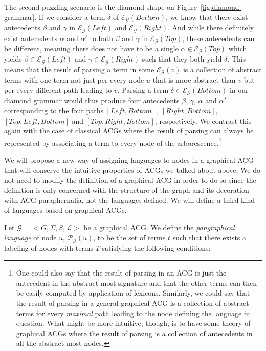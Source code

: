 The second puzzling scenario is the diamond shape on
Figure~\ref{fig:diamond-grammar}. If we consider a term $\delta$ of
$\mathcal{E}_{\mathcal{G}}(Bottom)$, we know that there exist
antecedents $\beta$ and $\gamma$ in $\mathcal{E}_{\mathcal{G}}(Left)$
and $\mathcal{E}_{\mathcal{G}}(Right)$. And while there definitely exist
antecedents $\alpha$ and $\alpha'$ to both $\beta$ and $\gamma$ in
$\mathcal{E}_{\mathcal{G}}(Top)$, these antecedents can be different,
meaning there does not have to be a single $\alpha \in
\mathcal{E}_{\mathcal{G}}(Top)$ which yields $\beta \in
\mathcal{E}_{\mathcal{G}}(Left)$ and $\gamma \in
\mathcal{E}_{\mathcal{G}}(Right)$ such that they both yield
$\delta$. This means that the result of parsing a term in some
$\mathcal{E}_{\mathcal{G}}(v)$ is a collection of abstract terms with
one term not just per every node $u$ that is more abstract than $v$ but
per every different path leading to $v$. Parsing a term $\delta \in
\mathcal{E}_{\mathcal{G}}(Bottom)$ in our diamond grammar would thus
produce four antecedents $\beta$, $\gamma$, $\alpha$ and $\alpha'$
corresponding to the four paths $[Left,Bottom]$, $[Right,Bottom]$,
$[Top,Left,Bottom]$ and $[Top,Right,Bottom]$, respectively. We contrast
this again with the case of classical ACGs where the result of parsing
can always be represented by associating a term to every node of the
arborescence.\footnote{One could also say that the result of parsing in
  an ACG is just the antecedent in the abstract-most signature and that
  the other terms can then be easily computed by application of
  lexicons. Similarly, we could say that the result of parsing in a
  general graphical ACG is a collection of abstract terms for every
  \emph{maximal} path leading to the node defining the language in
  question. What might be more intuitive, though, is to have some theory
  of graphical ACGs where the result of parsing is a collection of
  antecedents in all the abstract-most nodes.}

We will propose a new way of assigning languages to nodes in a graphical
ACG that will conserve the intuitive properties of ACGs we talked about
above. We do not need to modify the definition of a graphical ACG in
order to do so since the definition is only concerned with the structure
of the graph and its decoration with ACG paraphernalia, not the
languages defined. We will define a third kind of languages based on
graphical ACGs.

Let $\mathcal{G} = \mathopen{<} G, \Sigma, S, \mathcal{L} \mathclose{>}$
be a graphical ACG. We define the \emph{pangraphical language} of node
$u$, $\mathcal{P}_{\mathcal{G}}(u)$, to be the set of terms $t$ such
that there exists a labeling of nodes with terms $T$ satisfying the
following conditions:

